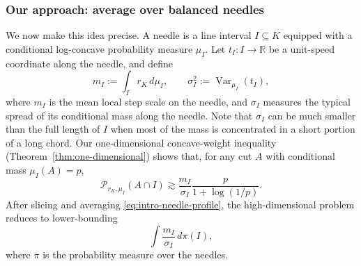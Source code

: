 \documentclass[11pt]{article}
\theoremstyle{definition}
\theoremstyle{remark}
\newcommand{\R}{\mathbb R}
\newcommand{\cP}{\mathcal P}
\newcommand{\rK}{r_K}
\begin{document}

\subsubsection{Our approach: average over balanced needles}\label{sec:tech_ov_ours}
We now make this idea precise.  A needle is a line interval $I\subseteq K$ equipped with a conditional log-concave probability measure $\mu_I$.  Let $t_I:I\to\R$ be a unit-speed coordinate along the needle, and define
\[
 m_I:=\int_I r_K\,d\mu_I,
 \qquad
 \sigma_I^2:=\operatorname{Var}_{\mu_I}(t_I),
\]
where $m_I$ is the mean local step scale on the needle, and $\sigma_I$ measures the typical spread of its conditional mass along the needle. Note that $\sigma_I$ can be much smaller than the full length of $I$ when most of the mass is concentrated in a short portion of a long chord. Our one-dimensional concave-weight inequality (Theorem~\ref{thm:one-dimensional}) shows that, for any cut $A$ with conditional mass $\mu_I(A)=p$,
\begin{equation}\label{eq:intro-needle-profile}
 \cP_{r_K,\mu_I}(A\cap I)
 \gtrsim
 \frac{m_I}{\sigma_I}
 \frac{p}{1+\log(1/p)}.
\end{equation}
After slicing and averaging \eqref{eq:intro-needle-profile}, the high-dimensional problem reduces to lower-bounding
\[
 \int\frac{m_I}{\sigma_I}\,d\pi(I),
\]
where $\pi$ is the probability measure over the needles.  
\end{document}
